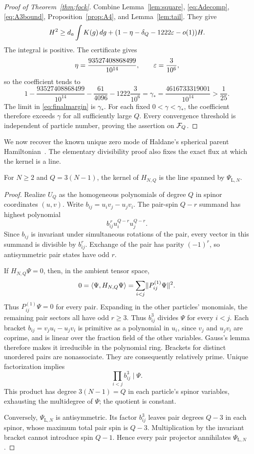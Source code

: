 \begin{proof}[Proof of Theorem~\ref{thm:fock}]
Combine Lemma~\ref{lem:square}, \eqref{eq:Adecomp}, \eqref{eq:A3bound}, Proposition~\ref{prop:A4}, and Lemma~\ref{lem:tail}. They give
\[
 H^2\ge d_a\int K(g)\,dg+
       (1-\eta-\delta_Q-1222\varepsilon-o(1))H.
\]
The integral is positive. The certificate gives
\[
 \eta=\frac{93527408868499}{10^{14}},\qquad\varepsilon=\frac3{10^6},
\]
so the coefficient tends to
\begin{equation}\label{eq:finalmargin}
 1-\frac{93527408868499}{10^{14}}-\frac{61}{4096}
   -1222\frac3{10^6}
 =\gamma_*=\frac{4616733319001}{10^{14}}>\frac1{25}.
\end{equation}
The limit in \eqref{eq:finalmargin} is $\gamma_*$. For each fixed $0<\gamma<\gamma_*$, the coefficient therefore exceeds $\gamma$ for all sufficiently large $Q$. Every convergence threshold is independent of particle number, proving the assertion on $\mathcal F_Q$.
\end{proof}

We now recover the known unique zero mode of Haldane's spherical
parent Hamiltonian~\cite[p.~606, Equations~(6)--(7)]{Haldane}.
The elementary divisibility proof also fixes the exact flux at which the
kernel is a line.

\begin{lemma}\label{lem:kernel}
For $N\ge2$ and $Q=3(N-1)$, the kernel of $H_{N,Q}$ is the line spanned by $\Psi_{\mathrm L,N}$.
\end{lemma}
\begin{proof}
Realize $U_Q$ as the homogeneous polynomials of degree $Q$ in spinor coordinates $(u,v)$. Write $b_{ij}=u_iv_j-u_jv_i$. The pair-spin $Q-r$ summand has highest polynomial
\[
 b_{ij}^{\,r}u_i^{Q-r}u_j^{Q-r}.
\]
Since $b_{ij}$ is invariant under simultaneous rotations of the pair, every vector in this summand is divisible by $b_{ij}^r$. Exchange of the pair has parity $(-1)^r$, so antisymmetric pair states have odd $r$.

If $H_{N,Q}\Psi=0$, then, in the ambient tensor space,
\[
 0=\langle \Psi,H_{N,Q}\Psi\rangle=\sum_{i<j}\lVert P_{ij}^{(1)}\Psi\rVert^2.
\]
Thus $P_{ij}^{(1)}\Psi=0$ for every pair. Expanding in the other particles' monomials, the remaining pair sectors all have odd $r\ge3$. Thus $b_{ij}^3$ divides $\Psi$ for every $i<j$. Each bracket $b_{ij}=v_ju_i-u_jv_i$ is primitive as a polynomial in $u_i$, since $v_j$ and $u_jv_i$ are coprime, and is linear over the fraction field of the other variables. Gauss's lemma therefore makes it irreducible in the polynomial ring. Brackets for distinct unordered pairs are nonassociate. They are consequently relatively prime. Unique factorization implies
\[
 \prod_{i<j}b_{ij}^3\mid\Psi.
\]
This product has degree $3(N-1)=Q$ in each particle's spinor variables, exhausting the multidegree of $\Psi$; the quotient is constant.

Conversely, $\Psi_{\mathrm L,N}$ is antisymmetric. Its factor $b_{ij}^3$ leaves pair degrees $Q-3$ in each spinor, whose maximum total pair spin is $Q-3$. Multiplication by the invariant bracket cannot introduce spin $Q-1$. Hence every pair projector annihilates $\Psi_{\mathrm L,N}$.
\end{proof}


